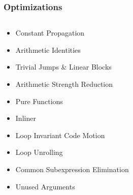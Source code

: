 \documentclass[navbaroff,en]{sdqbeamer}
\begin{document}
\begin{frame}
	\frametitle{Optimizations}

	\begin{columns}
		\begin{column}{0.48\textwidth}
			\begin{itemize}
				\item Constant Propagation
				\item Arithmetic Identities
				\item Trivial Jumps \& Linear Blocks
				\item Arithmetic Strength Reduction
				\item Pure Functions
				\item Inliner
				\item Loop Invariant Code Motion
				\item Loop Unrolling
				\item Common Subexpression Elimination

				\vspace{1em}

				\item Unused Arguments
			\end{itemize}
		\end{column}
		\begin{column}{0.48\textwidth}
			


\end{column}
\end{columns}
\end{frame}
\end{document}
